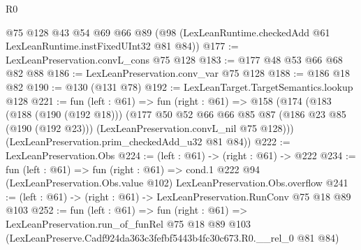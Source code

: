 \begin{lexlean}{R0}
\begin{coremodule}
    @75
    @128
    @43
    @54
    @69
    @66
    @89
    (@98 (LexLeanRuntime.checkedAdd @61 LexLeanRuntime.instFixedUInt32 @81 @84))
@177 := LexLeanPreservation.convL_cons @75 @128
@183 := @177 @48 @53 @66 @68 @82 @88
@186 := LexLeanPreservation.conv_var @75 @128
@188 := @186 @18 @82
@190 := @130 (@131 @78)
@192 := LexLeanTarget.TargetSemantics.lookup @128
@221 := fun (left : @61) =>
  fun (right : @61) =>
  @158
    (@174
      (@183
        (@188 (@190 (@192 @18)))
        (@177
          @50
          @52
          @66
          @66
          @85
          @87
          (@186 @23 @85 (@190 (@192 @23)))
          (LexLeanPreservation.convL_nil @75 @128)))
      (LexLeanPreservation.prim_checkedAdd_u32 @81 @84))
@222 := LexLeanPreservation.Obs
@224 := (left : @61) -> (right : @61) -> @222
@234 := fun (left : @61) =>
  fun (right : @61) =>
  cond.{1} @222 @94 (LexLeanPreservation.Obs.value @102) LexLeanPreservation.Obs.overflow
@241 := (left : @61) -> (right : @61) -> LexLeanPreservation.RunConv @75 @18 @89 @103
@252 := fun (left : @61) =>
  fun (right : @61) =>
  LexLeanPreservation.run_of_funRel
    @75
    @18
    @89
    @103
    (LexLeanPreserve.Cadf924da363c3fefbf5443b4fc30c673.R0.__rel_0 @81 @84)
\end{coremodule}
\end{lexlean}
